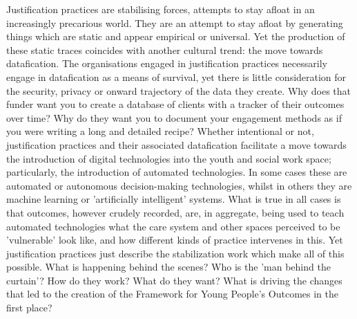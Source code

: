 Justification practices are stabilising forces, attempts to stay afloat in an increasingly precarious world. They are an attempt to stay afloat by generating things which are static and appear empirical or universal. Yet the production of these static traces coincides with another cultural trend: the move towards datafication. The organisations engaged in justification practices necessarily engage in datafication as a means of survival, yet there is little consideration for the security, privacy or onward trajectory of the data they create. Why does that funder want you to create a database of clients with a tracker of their outcomes over time? Why do they want you to document your engagement methods as if you were writing a long and detailed recipe? Whether intentional or not, justification practices and their associated datafication facilitate a move towards the introduction of digital technologies into the youth and social work space; particularly, the introduction of automated technologies. In some cases these are automated or autonomous decision-making technologies, whilst in others they are machine learning or 'artificially intelligent' systems. What is true in all cases is that outcomes, however crudely recorded, are, in aggregate, being used to teach automated technologies what the care system and other spaces perceived to be 'vulnerable' look like, and how different kinds of practice intervenes in this. Yet justification practices just describe the stabilization work which make all of this possible. What is happening behind the scenes? Who is the 'man behind the curtain'? How do they work? What do they want? What is driving the changes that led to the creation of the Framework for Young People's Outcomes in the first place?

